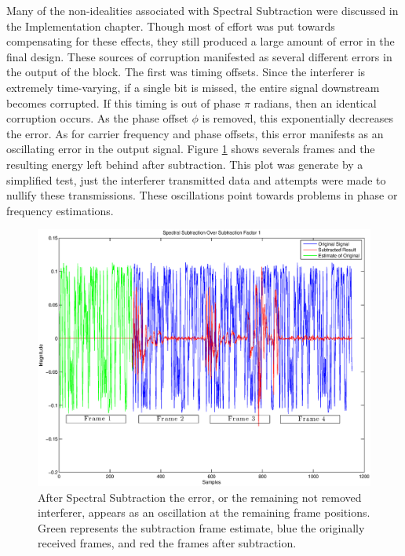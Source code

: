 Many of the non-idealities associated with Spectral Subtraction were discussed in the Implementation chapter.  Though most of effort was put towards compensating for these effects, they still produced a large amount of error in the final design.  These sources of corruption manifested as several different errors in the output of the block.  The first was timing offsets.  Since the interferer is extremely time-varying, if a single bit is missed, the entire signal downstream becomes corrupted.  If this timing is out of phase \(\pi\) radians, then an identical corruption occurs.  As the phase offset \(\phi\) is removed, this exponentially decreases the error.  As for carrier frequency and phase offsets, this error manifests as an oscillating error in the output signal.  Figure \ref{ss_oscillation} shows severals frames and the resulting energy left behind after subtraction.  This plot was generate by a simplified test, just the interferer transmitted data and attempts were made to nullify these transmissions.  These oscillations point towards problems in phase or frequency estimations.\\

\begin{figure}\label{ss_oscillation}
\centering
\includegraphics[scale=0.5]{ss_oscillation.eps}
\caption{After Spectral Subtraction the error, or the remaining not removed interferer, appears as an oscillation at the remaining frame positions.  Green represents the subtraction frame estimate, blue the originally received frames, and red the frames after subtraction.}
\end{figure}


